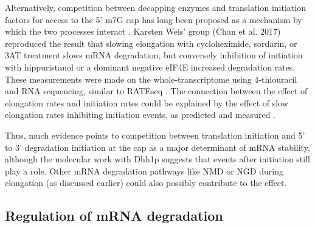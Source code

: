 Alternatively, competition between
decapping enzymes and translation initiation factors for access to the
5' m7G cap has long been proposed as a mechanism by which the two
processes interact 
\parencite{schwartz1999mutations,schwartz2000mrna}. Karsten Weis' group 
(Chan et al. 2017) 
\parencite{chan2017non}
reproduced the result
that slowing elongation with cycloheximide, sordarin, or 3AT treatment
slows mRNA degradation, but conversely inhibition of initiation with
hippuristanol or a dominant negative eIF4E increased degradation
rates. These measurements were made on the whole-transcriptome using
4-thiouracil and RNA sequencing, similar to RATEseq 
\parencite{neymotin2014determination}. 
The connection between the effect of elongation rates and
initiation rates could be explained by the effect of slow
elongation rates inhibiting initiation events, as predicted 
\parencite{shah2013rate} and measured \parencite{chu2014translation}.

Thus, much evidence points
to competition between translation initiation and 5’ to 3’ degradation
initiation at the cap as a major determinant of mRNA stability,
although the molecular work with Dhh1p suggests that events after
initiation still play a role. Other mRNA degradation pathways like NMD
or NGD during elongation (as discussed earlier) could also possibly
contribute to the effect.  

\subsection{ Regulation of mRNA degradation }


